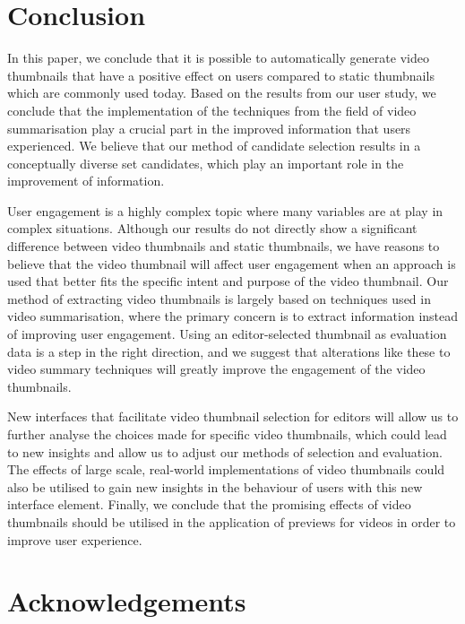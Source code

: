 \documentclass{../resources/sig-alternate-05-2015}
\begin{document}
\section{Conclusion}

In this paper, we conclude that it is possible to automatically generate video thumbnails that have a positive effect on users compared to static thumbnails which are commonly used today. Based on the results from our user study, we conclude that the implementation of the techniques from the field of video summarisation play a crucial part in the improved information that users experienced. We believe that our method of candidate selection results in a conceptually diverse set candidates, which play an important role in the improvement of information.

User engagement is a highly complex topic where many variables are at play in complex situations. Although our results do not directly show a significant difference between video thumbnails and static thumbnails, we have reasons to believe that the video thumbnail will affect user engagement when an approach is used that better fits the specific intent and purpose of the video thumbnail. Our method of extracting video thumbnails is largely based on techniques used in video summarisation, where the primary concern is to extract information instead of improving user engagement. Using an editor-selected thumbnail as evaluation data is a step in the right direction, and we suggest that alterations like these to video summary techniques will greatly improve the engagement of the video thumbnails.

New interfaces that facilitate video thumbnail selection for editors will allow us to further analyse the choices made for specific video thumbnails, which could lead to new insights and allow us to adjust our methods of selection and evaluation. The effects of large scale, real-world implementations of video thumbnails could also be utilised to gain new insights in the behaviour of users with this new interface element. Finally, we conclude that the promising effects of video thumbnails should be utilised in the application of previews for videos in order to improve user experience.
 
\section{Acknowledgements}
\end{document}

